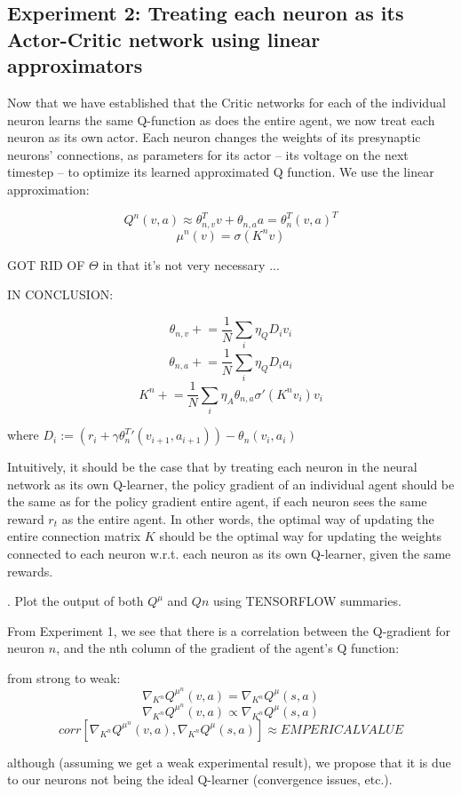 \subsection{Experiment 2: Treating each neuron as its Actor-Critic network using linear approximators}

Now that we have established that the Critic networks for each of the individual neuron learns the same Q-function as does the entire agent, we now treat each neuron as its own actor. Each neuron changes the weights of its presynaptic neurons' connections, as parameters for its actor -- its voltage on the next timestep -- to optimize its learned approximated Q function. We use the linear approximation:

$$Q^{n}(v, a) \approx \theta_{n,v}^T v + \theta_{n,a}a = \theta_{n}^T (v, a)^T$$
$$\mu^{n}(v) = \sigma(K^n v)$$

GOT RID OF $\Theta$ in that it's not very necessary ...

IN CONCLUSION:

$$\theta_{n,v} \mathrel{+}= \frac{1}{N} \sum_i \eta_Q D_i v_i$$
$$\theta_{n,a} \mathrel{+}= \frac{1}{N} \sum_i \eta_Q D_i a_i$$
$$K^n \mathrel{+}= \frac{1}{N} \sum_i \eta_A \theta_{n,a} \sigma'(K^n v_i) v_i$$

where $D_i := (r_i + \gamma {\theta_n^T}' (v_{i+1}, a_{i+1})) - \theta_n (v_{i}, a_{i}) $

Intuitively, it should be the case that by treating each neuron in the neural network as its own Q-learner, the policy gradient of an individual agent should be the same as for the policy gradient entire agent, if each neuron sees the same reward $r_t$ as the entire agent. In other words, the optimal way of updating the entire connection matrix $K$ should be the optimal way for updating the weights connected to each neuron w.r.t. each neuron as its own Q-learner, given the same rewards.


. Plot the output of both $Q^\mu$ and $Qn$ using TENSORFLOW summaries.

From Experiment 1, we see that there is a correlation between the Q-gradient for neuron $n$, and the nth column of the gradient of the agent's Q function:

from strong to weak:
$$\nabla_{K^n} Q^{\mu^n}(v,a) = \nabla_{K^n} Q^{\mu}(s,a)$$
$$\nabla_{K^n} Q^{\mu^n}(v,a) \propto \nabla_{K^n} Q^{\mu}(s,a)$$
$$corr[\nabla_{K^n} Q^{\mu^n}(v,a), \nabla_{K^n} Q^{\mu}(s,a)] \approx EMPERICAL VALUE$$

although (assuming we get a weak experimental result), we propose that it is due to our neurons not being the ideal Q-learner (convergence issues, etc.).

